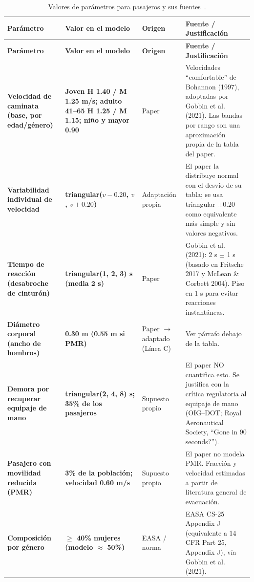 \documentclass[a4paper, 11pt]{article}
\begin{document}
{\small
\begin{longtable}{L{2.9cm}L{3.3cm}L{1.9cm}L{5.6cm}}
\caption{Valores de par\'ametros para pasajeros y sus
fuentes~\cite{gobbin2021, bohannon1997, cfrAppJ, raes_gone90, oig_dot,
yugendar2018}.}\label{tab:parametros}\\
\toprule
\textbf{Par\'ametro} & \textbf{Valor en el modelo} & \textbf{Origen} & \textbf{Fuente / Justificaci\'on} \\
\midrule
\endfirsthead
\toprule
\textbf{Par\'ametro} & \textbf{Valor en el modelo} & \textbf{Origen} & \textbf{Fuente / Justificaci\'on} \\
\midrule
\endhead
\bottomrule
\endfoot
\textbf{Velocidad de caminata (base, por edad/g\'enero)} & \textbf{Joven H 1.40 / M 1.25 m/s; adulto 41--65 H 1.25 / M 1.15; ni\~no y mayor 0.90} & Paper & Velocidades ``comfortable'' de Bohannon (1997), adoptadas por Gobbin et al. (2021). Las bandas por rango son una aproximaci\'on propia de la tabla del paper. \\
\midrule
\textbf{Variabilidad individual de velocidad} & \textbf{triangular($v-0.20$, $v$, $v+0.20$)} & Adaptaci\'on propia & El paper la distribuye normal con el desv\'io de su tabla; se usa triangular $\pm$0.20 como equivalente m\'as simple y sin valores negativos. \\
\midrule
\textbf{Tiempo de reacci\'on (desabroche de cintur\'on)} & \textbf{triangular(1, 2, 3) s (media 2 s)} & Paper & Gobbin et al. (2021): 2 s $\pm$ 1 s (basado en Fritsche 2017 y McLean \& Corbett 2004). Piso en 1 s para evitar reacciones instant\'aneas. \\
\midrule
\textbf{Di\'ametro corporal (ancho de hombros)} & \textbf{0.30 m (0.55 m si PMR)} & Paper $\rightarrow$ adaptado (L\'inea C) & Ver p\'arrafo debajo de la tabla. \\
\midrule
\textbf{Demora por recuperar equipaje de mano} & \textbf{triangular(2, 4, 8) s; 35\% de los pasajeros} & Supuesto propio & El paper NO cuantifica esto. Se justifica con la cr\'itica regulatoria al equipaje de mano (OIG--DOT; Royal Aeronautical Society, ``Gone in 90 seconds?''). \\
\midrule
\textbf{Pasajero con movilidad reducida (PMR)} & \textbf{3\% de la poblaci\'on; velocidad 0.60 m/s} & Supuesto propio & El paper no modela PMR. Fracci\'on y velocidad estimadas a partir de literatura general de evacuaci\'on. \\
\midrule
\textbf{Composici\'on por g\'enero} & \textbf{$\geq$ 40\% mujeres (modelo $\approx$ 50\%)} & EASA / norma & EASA CS-25 Appendix J (equivalente a 14 CFR Part 25, Appendix J), v\'ia Gobbin et al. (2021). \\

\end{longtable}}
\end{document}
